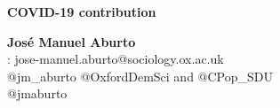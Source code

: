 \documentclass[xcolor={dvipsnames}]{beamer}
\begin{document}
\begin{frame}
\begin{center}
 \LARGE{\textbf{COVID-19 contribution}}
\end{center}



\end{frame}








\begin{frame}
 \begin{center}

			\color{black}\Large{\textbf{Jos\'{e} Manuel Aburto}}\\	
				
		\faEnvelope: jose-manuel.aburto@sociology.ox.ac.uk\\		
			\faTwitter \quad @jm\_aburto  @OxfordDemSci and @CPop\_SDU \\
			\faGithub \quad @jmaburto 
			$\,$\\
						$\,$\\
						\end{center}
						
					





 
 

\end{frame}
\end{document}
